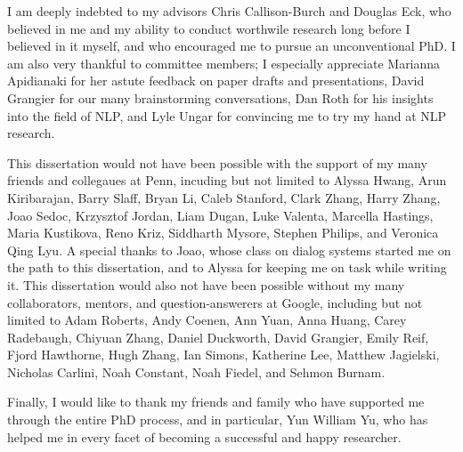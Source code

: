 
I am deeply indebted to my advisors Chris Callison-Burch and Douglas Eck, who believed in me and my ability to conduct worthwile research long before I believed in it myself, and who encouraged me to pursue an unconventional PhD.
I am also very thankful to committee members;
I especially appreciate Marianna Apidianaki for her astute feedback on paper drafts and presentations, David Grangier for our many brainstorming conversations,  Dan Roth for his insights into the field of NLP, and Lyle Ungar for convincing me to try my hand at NLP research.

This dissertation would not have been possible with the support of my many friends and collegaues at Penn, incuding but not limited to
Alyssa Hwang, 
Arun Kiribarajan,
Barry Slaff,
Bryan Li, 
Caleb Stanford,
Clark Zhang,
Harry Zhang,
Joao Sedoc, 
Krzysztof Jordan,
Liam Dugan,
Luke Valenta,
Marcella Hastings,
Maria Kustikova, 
Reno Kriz, 
Siddharth Mysore,
Stephen Philips, and
Veronica Qing Lyu.
A special thanks to Joao, whose class on dialog systems started me on the path to this dissertation, and to Alyssa for keeping me on task while writing it.
This dissertation would also not have been possible without my many collaborators, mentors, and question-answerers at Google, including but not limited to
Adam Roberts, 
Andy Coenen,
Ann Yuan,
Anna Huang,
Carey Radebaugh,
Chiyuan Zhang,
Daniel Duckworth,
David Grangier,
Emily Reif,
Fjord Hawthorne,
Hugh Zhang,
Ian Simons,
Katherine Lee,
Matthew Jagielski,
Nicholas Carlini,
Noah Constant,
Noah Fiedel, and
Sehmon Burnam.

Finally, I would like to thank my friends and family who have supported me through the entire PhD process,
and in particular, Yun William Yu, who has helped me in every facet of becoming a successful and happy researcher.


